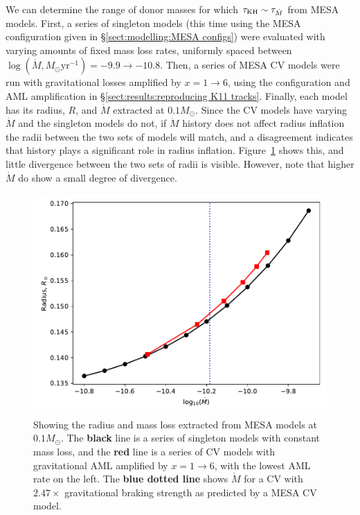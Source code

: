 We can determine the range of donor masses for which $\tau_{\rm KH} \sim \tau_{\dot M}$ from MESA models.
First, a series of singleton models (this time using the MESA configuration given in \S\ref{sect:modelling:MESA configs}) were evaluated with varying amounts of fixed mass loss rates, uniformly spaced between $\log (\dot M, M_\odot \mathrm{yr}^{-1}) = -9.9 \rightarrow -10.8$.
Then, a series of MESA CV models were run with gravitational losses amplified by $x = 1 \rightarrow 6$, using the configuration and AML amplification in \S\ref{sect:results:reproducing K11 tracks}.
Finally, each model has its radius, $R$, and $\dot M$ extracted at $0.1 M_\odot$. Since the CV models have varying $\dot M$ and the singleton models do not, if $\dot M$ history does not affect radius inflation the radii between the two sets of models will match, and a disagreement indicates that history plays a significant role in radius inflation.
 Figure~\ref{fig:results:comparing radii at 0.1Msun} shows this, and little divergence between the two sets of radii is visible. However, note that higher $\dot M$ do show a small degree of divergence.
\begin{figure}
    \centering
    \includegraphics[width=.8\textwidth]{figures/modelling/compare_0.1Msun_with_CV_track_K11_fig1.pdf}
    \caption{Showing the radius and mass loss extracted from MESA models at $0.1 M_\odot$. The {\bf black} line is a series of singleton models with constant mass loss, and the {\bf red} line is a series of CV models with gravitational AML amplified by $x = 1 \rightarrow 6$, with the lowest AML rate on the left. The {\bf blue dotted line} shows $\dot M$ for a CV with $2.47\times$ gravitational braking strength as predicted by a MESA CV model.}
    \label{fig:results:comparing radii at 0.1Msun}
\end{figure}

